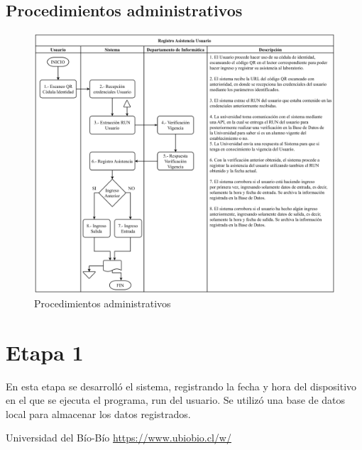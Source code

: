 \documentclass{templateReport}
\begin{document}
\subsection{Procedimientos administrativos}
\begin{figure}[H]
    \centering
    \includegraphics[scale=0.06]{img/TS-SI-Procedo Administrativo.drawio.png}
    \caption{Procedimientos administrativos}
    \label{fig:procedimientosAdministrativos}
\end{figure}

\newpage
\section{Etapa 1}
En esta etapa se desarrolló el sistema, registrando la fecha y hora del dispositivo en el que se ejecuta el programa, run del usuario. Se utilizó una base de datos local para almacenar los datos registrados.
\newpage
\begin{thebibliography}{99}
     Universidad del Bío-Bío \url{https://www.ubiobio.cl/w/}
\end{thebibliography}
\end{document}
